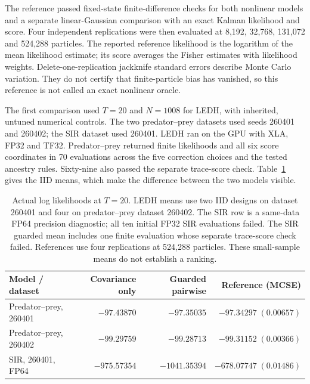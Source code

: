 The reference passed fixed-state finite-difference checks for both nonlinear
models and a separate linear-Gaussian comparison with an exact Kalman
likelihood and score.  Four independent replications were then evaluated at
8,192, 32,768, 131,072 and 524,288 particles.  The reported reference likelihood
is the logarithm of the mean likelihood estimate; its score averages the
Fisher estimates with likelihood weights.  Delete-one-replication jackknife
standard errors describe Monte Carlo variation.  They do not certify that
finite-particle bias has vanished, so this reference is not called an exact
nonlinear oracle.

The first comparison used \(T=20\) and \(N=1008\) for LEDH, with inherited,
untuned numerical controls.  The two predator--prey datasets used seeds
260401 and 260402; the SIR dataset used 260401.  LEDH ran on the GPU with
XLA, FP32 and TF32.  Predator--prey returned finite likelihoods and all six
score coordinates in 70 evaluations across the five correction choices and
the tested ancestry rules.  Sixty-nine also passed the separate trace-score
check.  Table~\ref{tab:bf-nonlinear-first-likelihoods} gives the IID means,
which make the difference between the two models visible.

\begin{table}[htbp]
\centering
\small
\begin{tabular}{lrrr}
\toprule
Model / dataset & Covariance only & Guarded pairwise & Reference (MCSE)\\
\midrule
Predator--prey, 260401 & $-97.43870$ & $-97.35035$ & $-97.34297\;(0.00657)$\\
Predator--prey, 260402 & $-99.29759$ & $-99.28713$ & $-99.31152\;(0.00366)$\\
SIR, 260401, FP64 & $-975.57354$ & $-1041.35394$ & $-678.07747\;(0.01486)$\\
\bottomrule
\end{tabular}
\caption{Actual log likelihoods at \(T=20\).  LEDH means use two IID designs
on dataset 260401 and four on predator--prey dataset 260402.  The SIR row is a
same-data FP64 precision diagnostic; all ten initial FP32 SIR evaluations
failed.  The SIR guarded mean includes one finite evaluation whose separate
trace-score check failed.  References use four replications at 524,288
particles.  These small-sample means do not establish a ranking.}
\label{tab:bf-nonlinear-first-likelihoods}
\end{table}

